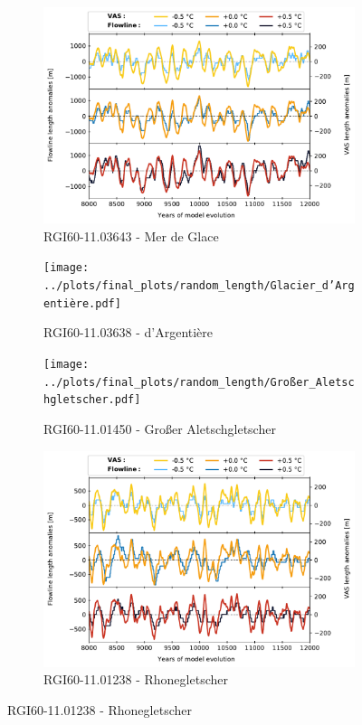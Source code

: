 \begin{figure}[htp]
            \begin{subfigure}[b]{0.48\textwidth}
              \caption{RGI60-11.03643 - Mer de Glace}
              \label{fig:random_length:mer_de_glace}
              \centering
              \includegraphics[width=\textwidth]{../plots/final_plots/random_length/Mer_de_Glace.pdf}
            \end{subfigure}
            \hfill
            \begin{subfigure}[b]{0.48\textwidth}
              \caption{RGI60-11.03638 - d'Argentière}
              \label{fig:random_length:glacier_d_argentiere}
              \centering
              \texttt{[image: ../plots/final\_plots/random\_length/Glacier\_d'Argentière.pdf]}
            \end{subfigure}
            \begin{subfigure}[b]{0.48\textwidth}
              \caption{RGI60-11.01450 - Großer Aletschgletscher}
              \label{fig:random_length:großer_aletschgletscher}
              \centering
              \texttt{[image: ../plots/final\_plots/random\_length/Großer\_Aletschgletscher.pdf]}
            \end{subfigure}
            \hfill
            \begin{subfigure}[b]{0.48\textwidth}
              \caption{RGI60-11.01238 - Rhonegletscher}
              \label{fig:random_length:rhonegletscher}
              \centering
              \includegraphics[width=\textwidth]{../plots/final_plots/random_length/Rhonegletscher.pdf}

\end{subfigure}
\end{figure}
